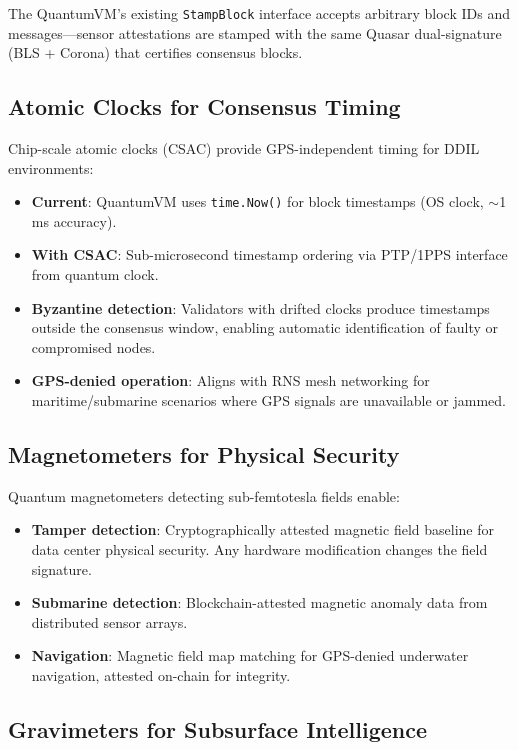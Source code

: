 \documentclass[11pt,letterpaper]{article}
\begin{document}
The QuantumVM's existing \texttt{StampBlock} interface accepts arbitrary block IDs and messages---sensor attestations are stamped with the same Quasar dual-signature (BLS + Corona) that certifies consensus blocks.

\subsection{Atomic Clocks for Consensus Timing}

Chip-scale atomic clocks (CSAC) provide GPS-independent timing for DDIL environments:

\begin{itemize}
\item \textbf{Current}: QuantumVM uses \texttt{time.Now()} for block timestamps (OS clock, $\sim$1 ms accuracy).
\item \textbf{With CSAC}: Sub-microsecond timestamp ordering via PTP/1PPS interface from quantum clock.
\item \textbf{Byzantine detection}: Validators with drifted clocks produce timestamps outside the consensus window, enabling automatic identification of faulty or compromised nodes.
\item \textbf{GPS-denied operation}: Aligns with RNS mesh networking for maritime/submarine scenarios where GPS signals are unavailable or jammed.
\end{itemize}

\subsection{Magnetometers for Physical Security}

Quantum magnetometers detecting sub-femtotesla fields enable:

\begin{itemize}
\item \textbf{Tamper detection}: Cryptographically attested magnetic field baseline for data center physical security. Any hardware modification changes the field signature.
\item \textbf{Submarine detection}: Blockchain-attested magnetic anomaly data from distributed sensor arrays.
\item \textbf{Navigation}: Magnetic field map matching for GPS-denied underwater navigation, attested on-chain for integrity.
\end{itemize}

\subsection{Gravimeters for Subsurface Intelligence}
\end{document}
